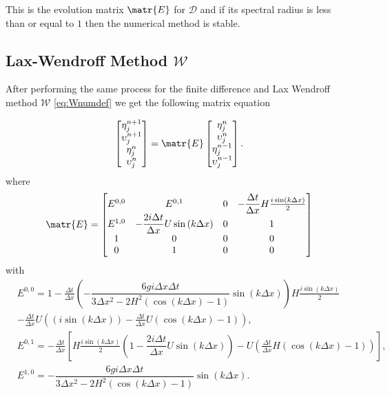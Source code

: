 This is the evolution matrix $\matr{E}$ for $\mathcal{D}$ and if its spectral radius is less than or equal to $1$ then the numerical method is stable.


\subsection{Lax-Wendroff Method $\mathcal{W}$ }
After performing the same process for the finite difference and Lax Wendroff method $\mathcal{W}$ \eqref{eq:Wnumdef} we get the following matrix equation

\begin{equation}
\begin{bmatrix}
\eta^{n+1}_j \\
\upsilon^{n+1}_j\\
\eta^n_j \\
\upsilon^n_j
\end{bmatrix}= \matr{E}  \begin{bmatrix}
\eta^{n}_j \\
\upsilon^{n}_j\\
\eta^{n-1}_j \\
\upsilon^{n-1}_j
\end{bmatrix}.
\end{equation}
where
\begin{equation}
\matr{E} = \begin{bmatrix}
{E}^{0,0} & {E}^{0,1} & 0 & - \dfrac{\Delta t}{\Delta x}H\frac{i\sin\left(k\Delta x\right)}{2} \\
{E}^{1,0} & -\dfrac{2i \Delta t }{\Delta x} U \sin\left(k \Delta x\right)&0 & 1 \\
1&0&0&0\\
0&1&0&0
\end{bmatrix}
\end{equation}
with
\begin{align*}
&{E}^{0,0} = 1 - \frac{\Delta t}{\Delta x}\left(-\dfrac{6 gi \Delta x\Delta t}{3 \Delta x^2 -2{H^2} \left( \cos\left(k \Delta x\right) - 1 \right)}{ \sin\left(k \Delta x\right)}\right)H\frac{i\sin\left(k\Delta x\right)}{2} \\ &- \frac{\Delta t}{\Delta x}U\left(\left(i\sin\left(k\Delta x\right)\right) - \frac{\Delta t}{\Delta x}U\left(\cos\left(k\Delta x\right) - 1\right)\right), \\
&{E}^{0,1} = - \frac{\Delta t}{\Delta x} \left[H\frac{i\sin\left(k\Delta x\right)}{2}\left( 1 -\dfrac{2i \Delta t }{\Delta x} U \sin\left(k \Delta x\right) \right)   -U\left(\frac{\Delta t}{\Delta x}H\left(\cos\left(k\Delta x\right) - 1\right)\right) \right],\\
& {E}^{1,0} =-\dfrac{6 gi \Delta x\Delta t}{3 \Delta x^2 -2{H^2} \left( \cos\left(k \Delta x\right) - 1 \right)}{ \sin\left(k \Delta x\right)}.
\end{align*}


